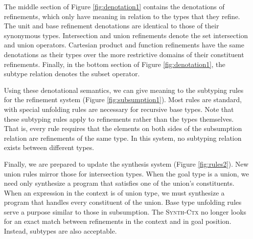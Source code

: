 The middle section of Figure \ref{fig:denotation1} contains the denotations of refinements,
which only have meaning in relation to the types that they refine.  The unit and base refinement
denotations are identical to those of their synonymous types.  Intersection and union refinements
denote the set intersection and union operators.  Cartesian product and function refinements
have the same denotations as their types over the more restrictive domains of their constituent
refinements.  Finally, in the bottom section of Figure \ref{fig:denotation1}, the subtype
relation denotes the subset operator.

Using these denotational semantics, we can give meaning to the subtyping rules for the refinement
system (Figure \ref{fig:subsumption1}).  Most rules are standard, with special unfolding
rules are necessary for recursive base types.  Note that these subtyping rules apply to refinements
rather than the types themselves.
That is, every rule requires that the elements on both sides of the
subsumption relation are refinements of the same type.  In this system, no subtyping relation
exists between different types.

Finally, we are prepared to update the synthesis system (Figure \ref{fig:rules2}).
New union rules mirror those for intersection
types.  When the goal type is a union, we need only synthesize a program that satisfies one
of the union's constituents.  When an expression in the context is of union type, we must synthesize
a program that handles every constituent of the union.  Base type unfolding rules serve
a purpose similar to those in subsumption.  The \textsc{Synth-Ctx} no longer looks for
an exact match between refinements in the context and in goal position.  Instead, subtypes
are also acceptable.